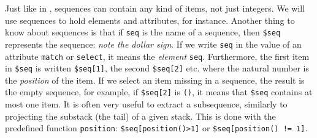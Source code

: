 Just like in \Erlang, sequences can contain any kind of items, not
just integers. We will use sequences to hold \XML elements and
attributes, for instance. Another thing to know about sequences is
that if \texttt{seq} is the name of a sequence, then \texttt{\$seq}
represents the sequence: \emph{note the dollar sign}. If we write
\texttt{seq} in the value of an attribute \texttt{match} or
\texttt{select}, it means the \emph{element}
\texttt{seq}. Furthermore, the first item in \texttt{\$seq} is written
\texttt{\$seq[1]}, the second \texttt{\$seq[2]} etc. where the natural
number is the \emph{position} of the item. If we select an item
missing in a sequence, the result is the empty sequence, for example,
if \texttt{\$seq[2]} is \texttt{()}, it means that \texttt{\$seq}
contains at most one item. It is often very useful to extract a
subsequence, similarly to projecting the substack (the tail) of a
given stack. This is done with the predefined function
\texttt{position}: \texttt{\$seq[position()>1]} or
\texttt{\$seq[position() != 1]}.



